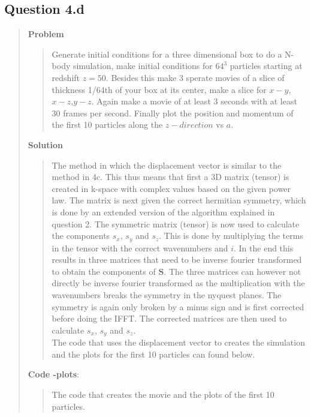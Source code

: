 
\subsection*{\textbf{Question 4.d}}
\begin{quote}

\textbf{Problem}
\begin{quote} 
Generate initial conditions for a three dimensional box to do a N-body simulation, make initial conditions for $64^3$ particles starting at redshift $z = 50$. Besides this make 3 sperate movies of a slice of thickness 1/64th of your box at its center, make a slice for $x-y$, $x-z$,$y-z$. Again make a movie of at least 3 seconds with at least 30 frames per second. Finally plot the position and momentum of the first 10 particles along the $z-direction$ vs $a$.
\end{quote}

\textbf{Solution} 
\begin{quote}
The method in which the displacement vector is similar to the method in 4c. This thus means that first a 3D matrix (tensor) is created in k-space with complex values based on the given power law. The matrix is next given the correct hermitian symmetry, which is done by an extended version of the algorithm explained in question 2. The symmetric matrix (tensor) is now used to calculate the components $s_x$, $s_y$ and $s_z$. This is  done by multiplying the terms in the tensor with the correct wavenumbers and $i$. In the end this results in three matrices that need to be inverse fourier transformed to obtain the components of $\textbf{S}$. The three matrices can however not directly be inverse fourier transformed as the multiplication with the wavenumbers breaks the symmetry in the nyquest planes. The symmetry is again only broken by a minus sign and is first corrected before doing the IFFT. The corrected matrices are then used to calculate $s_x$, $s_y$ and $s_z$. 
\\
The code that uses the displacement vector to creates the simulation and the plots for the first 10 particles can found below.

\end{quote}

\textbf{Code -plots}:
\begin{quote}

The code that creates the movie and the plots of the first 10 particles. 

\end{quote}



\end{quote}
